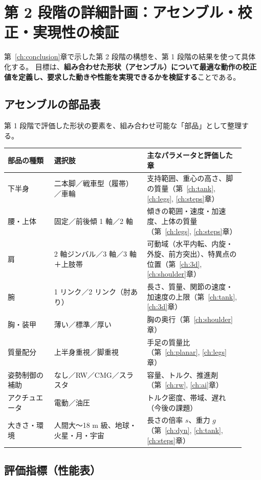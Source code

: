 \chapter{第 2 段階の詳細計画：アセンブル・校正・実現性の検証}\label{ch:phase2}

第~\ref{ch:conclusion}章で示した第 2 段階の構想を、第 1 段階の結果を使って具体化する。
目標は、\textbf{組み合わせた形状（アセンブル）について最適な動作の校正値を定義し、要求した動きや性能を実現できるかを検証する}ことである。

\section{アセンブルの部品表}

第 1 段階で評価した形状の要素を、組み合わせ可能な「部品」として整理する。

\begin{longtable}{p{0.18\linewidth}p{0.36\linewidth}p{0.38\linewidth}}
\toprule
部品の種類 & 選択肢 & 主なパラメータと評価した章 \\ \midrule \endhead
下半身 & 二本脚／戦車型（履帯）／車輪 & 支持範囲、重心の高さ、脚の質量（第~\ref{ch:tank}, \ref{ch:legs}, \ref{ch:steps}章） \\
腰・上体 & 固定／前後傾 1 軸／2 軸 & 傾きの範囲・速度・加速度、上体の質量（第~\ref{ch:legs}, \ref{ch:steps}章） \\
肩 & 2 軸ジンバル／3 軸／3 軸＋上肢帯 & 可動域（水平内転、内旋・外旋、前方突出）、特異点の位置（第~\ref{ch:3d}, \ref{ch:shoulder}章） \\
腕 & 1 リンク／2 リンク（肘あり） & 長さ、質量、関節の速度・加速度の上限（第~\ref{ch:tank}, \ref{ch:3d}章） \\
胸・装甲 & 薄い／標準／厚い & 胸の奥行（第~\ref{ch:shoulder}章） \\
質量配分 & 上半身重視／脚重視 & 手足の質量比（第~\ref{ch:planar}, \ref{ch:legs}章） \\
姿勢制御の補助 & なし／RW／CMG／スラスタ & 容量、トルク、推進剤（第~\ref{ch:rw}, \ref{ch:ai}章） \\
アクチュエータ & 電動／油圧 & トルク密度、帯域、遅れ（今後の課題） \\
大きさ・環境 & 人間大〜18 m 級、地球・火星・月・宇宙 & 長さの倍率 $s$、重力 $g$（第~\ref{ch:dyn}, \ref{ch:tank}, \ref{ch:steps}章） \\
\bottomrule
\end{longtable}

\section{評価指標（性能表）}

